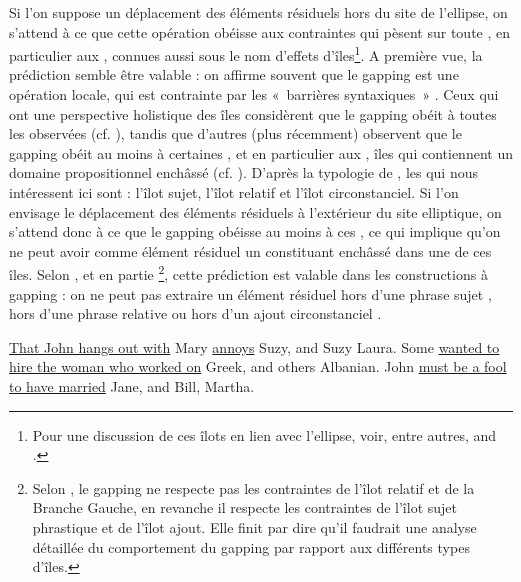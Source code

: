 Si l’on suppose un déplacement des éléments résiduels hors du site de l’ellipse, on s’attend à ce que cette opération obéisse aux contraintes qui pèsent sur toute , en particulier aux , connues aussi sous le nom d’effets d’îles\footnote{
 Pour une discussion de ces îlots en lien avec l’ellipse, voir, entre autres, \citet{Ross1967} and \citet{Merchant2001,Merchant2004}.}. A première vue, la prédiction semble être valable : on affirme souvent que le gapping est une opération locale, qui est contrainte par les «~barrières syntaxiques~» \citep{Hankamer1973,Neijt1979,Chao1988,Johnson1996/2004,Coppock2001,Winkler2005}. Ceux qui ont une perspective holistique des îles considèrent que le gapping obéit à toutes les  observées (cf. \citealt{Ross1967,Neijt1979}), tandis que d’autres (plus récemment) observent que le gapping obéit au moins à certaines , et en particulier aux , {\cad} îles qui contiennent un domaine propositionnel enchâssé (cf. \citealt{Hartmann2000,Coppock2001}). D’après la typologie de \citet{Merchant2001}, les  qui nous intéressent ici sont : l’îlot sujet, l’îlot relatif et l’îlot circonstanciel. Si l’on envisage le déplacement des éléments résiduels à l’extérieur du site elliptique, on s’attend donc à ce que le gapping obéisse au moins à ces , ce qui implique qu’on ne peut avoir comme élément résiduel un constituant enchâssé dans une de ces îles. Selon \citet{Hartmann2000}, \citet{Coppock2001} et en partie \citet{Repp2009}\footnote{
 Selon \citet{Repp2009}, le gapping ne respecte pas les contraintes de l’îlot relatif et de la Branche Gauche, en revanche il respecte les contraintes de l’îlot sujet phrastique et de l’îlot ajout. Elle finit par dire qu’il faudrait une analyse détaillée du comportement du gapping par rapport aux différents types d’îles.}, cette prédiction est valable dans les constructions à gapping : on ne peut pas extraire un élément résiduel hors d’une phrase sujet , hors d’une phrase relative  ou hors d’un ajout circonstanciel .

\ea \label{ch2:ex215}
\ea *\uline{That John hangs out with} Mary \uline{annoys} Suzy, and Suzy Laura. \citep{Coppock2001} \label{ch2:ex215a}
\ex *Some \uline{wanted to hire the woman who worked on} Greek, and others Albanian. \citep{Merchant2009} \label{ch2:ex215b}
\ex *John \uline{must be a fool to have married} Jane, and Bill, Martha. \citep{Coppock2001} \label{ch2:ex215c}
\z
\z

